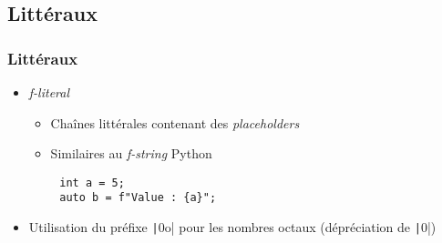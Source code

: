\documentclass[C++.tex]{subfiles}
\begin{document}
\subsection*{Littéraux}
\begin{frame}[fragile]
	\frametitle{Littéraux}
	\begin{itemize}
		\item \textit{f-literal}
		\begin{itemize}
			\item Chaînes littérales contenant des \textit{placeholders}
			\item Similaires au \textit{f-string} Python
		\end{itemize}
	\end{itemize}

	\begin{verbatim}
		int a = 5;
		auto b = f"Value : {a}";
	\end{verbatim}

	\begin{itemize}
		\item Utilisation du préfixe \texttt|0o| pour les nombres octaux (dépréciation de \texttt|0|)
	\end{itemize}

\end{frame}
\end{document}
